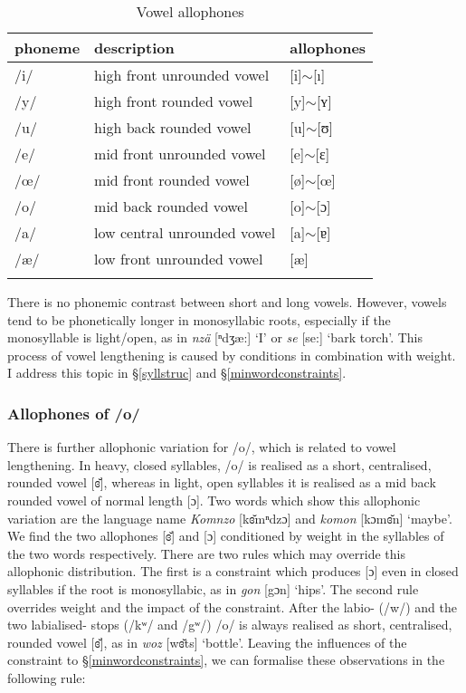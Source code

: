 \begin{table}
\caption{Vowel allophones}
\label{allovowel}
	\begin{tabular}{ll@{~~$\rightarrow$~~}l}
		\lsptoprule
		phoneme&description&allophones\\\midrule
		/i/ &high front unrounded vowel & [i]$\sim$[ı]\\
		/y/ &high front rounded vowel & [y]$\sim$[ʏ]\\
		/u/ &high back rounded vowel & [u]$\sim$[ʊ]\\
		/e/ &mid front unrounded vowel & [e]$\sim$[ɛ]\\
		/œ/ &mid front rounded vowel & [ø]$\sim$[œ]\\
		/o/ &mid back rounded vowel & [o]$\sim$[ɔ]\\
		/a/ &low central unrounded vowel & [a]$\sim$[ɐ]\\
		/æ/ &low front unrounded vowel & [æ]\\
		\lspbottomrule
	\end{tabular}
\end{table}%

There is no phonemic contrast between short and long vowels. However, vowels tend to be phonetically longer in monosyllabic roots, especially if the monosyllable is light/open, as in \emph{nzä} [ⁿdʒæ:] `I' or \emph{se} [se:] `bark torch'. This process of vowel lengthening is caused by  conditions in combination with  weight. I address this topic in {\S}\ref{syllstruc} and {\S}\ref{minwordconstraints}.

\subsubsection{Allophones of /o/}\label{allo-o}

There is further allophonic variation for /o/, which is related to vowel lengthening. In heavy, closed syllables, /o/ is realised as a short, centralised, rounded vowel [ɞ̆], whereas in light, open syllables it is realised as a mid back rounded vowel of normal length [ɔ]. Two words which show this allophonic variation are the language name \emph{Komnzo} [kɞ̆mⁿdzɔ] and \emph{komon} [kɔmɞ̆n] `maybe'. We find the two allophones [ɞ̆] and [ɔ] conditioned by  weight in the syllables of the two words respectively. There are two rules which may override this allophonic distribution. The first is a  constraint which produces [ɔ] even in closed syllables if the root is monosyllabic, as in \emph{gon} [{\ᵑ}gɔn] `hips'. The second rule overrides  weight and the impact of the  constraint. After the labio-  (/w/) and the two labialised- stops (/kʷ/ and /{\ᵑ}gʷ/) /o/ is always realised as short, centralised, rounded vowel [ɞ̆], as in \emph{woz} [wɞ̆ts] `bottle'. Leaving the influences of the  constraint to {\S}\ref{minwordconstraints}, we can formalise these observations in the following rule:

